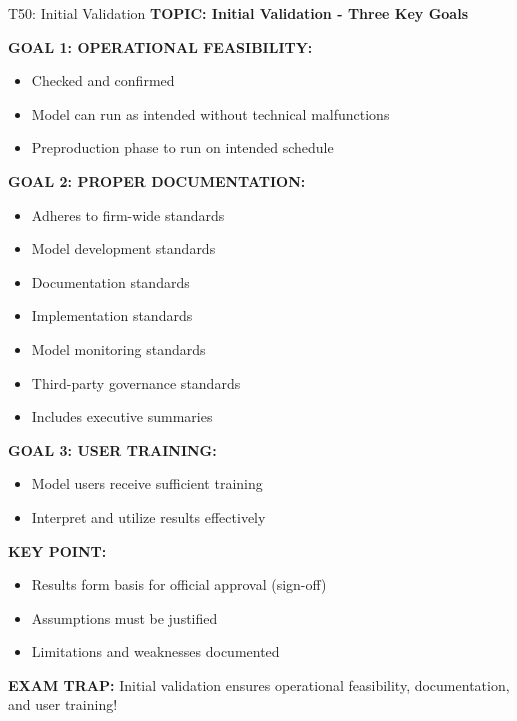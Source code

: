 \documentclass[8pt]{beamer}
\begin{document}
	\begin{frame}{T50: Initial Validation}
		\fontsize{6.5}{7.5}\selectfont
		\textbf{TOPIC: Initial Validation - Three Key Goals}
		
		\vspace{0.1cm}
		\textbf{GOAL 1: OPERATIONAL FEASIBILITY:}
		\begin{itemize}
			\item Checked and confirmed
			\item Model can run as intended without technical malfunctions
			\item Preproduction phase to run on intended schedule
		\end{itemize}
		
		\vspace{0.1cm}
		\textbf{GOAL 2: PROPER DOCUMENTATION:}
		\begin{itemize}
			\item Adheres to firm-wide standards
			\item Model development standards
			\item Documentation standards
			\item Implementation standards
			\item Model monitoring standards
			\item Third-party governance standards
			\item Includes executive summaries
		\end{itemize}
		
		\vspace{0.1cm}
		\textbf{GOAL 3: USER TRAINING:}
		\begin{itemize}
			\item Model users receive sufficient training
			\item Interpret and utilize results effectively
		\end{itemize}
		
		\vspace{0.1cm}
		\textbf{KEY POINT:}
		\begin{itemize}
			\item Results form basis for official approval (sign-off)
			\item Assumptions must be justified
			\item Limitations and weaknesses documented
		\end{itemize}
		
		\textcolor{myred}{\textbf{EXAM TRAP:}} Initial validation ensures \textcolor{myblue}{operational feasibility, documentation, and user training}!
	\end{frame}
	
\end{document}

